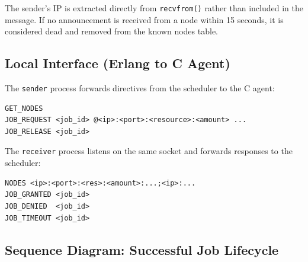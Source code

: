\documentclass[12pt,a4paper]{article}
\begin{document}
The sender's IP is extracted directly from \texttt{recvfrom()} rather than
included in the message. If no announcement is received from a node within
15 seconds, it is considered dead and removed from the known nodes table.

\subsection{Local Interface (Erlang to C Agent)}

The \texttt{sender} process forwards directives from the scheduler to the C agent:

\begin{lstlisting}
GET_NODES
JOB_REQUEST <job_id> @<ip>:<port>:<resource>:<amount> ...
JOB_RELEASE <job_id>
\end{lstlisting}

The \texttt{receiver} process listens on the same socket and forwards responses to the scheduler:

\begin{lstlisting}
NODES <ip>:<port>:<res>:<amount>:...;<ip>:...
JOB_GRANTED <job_id>
JOB_DENIED  <job_id>
JOB_TIMEOUT <job_id>
\end{lstlisting}

\subsection{Sequence Diagram: Successful Job Lifecycle}
\end{document}
